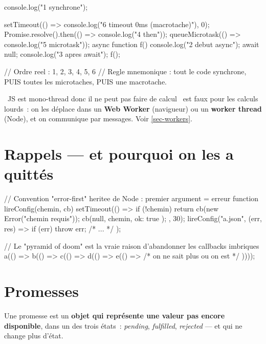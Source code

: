 \begin{codejs}
console.log("1 synchrone");

setTimeout(() => console.log("6 timeout 0ms (macrotache)"), 0);
Promise.resolve().then(() => console.log("4 then"));
queueMicrotask(() => console.log("5 microtask"));
async function f() { console.log("2 debut async"); await null; console.log("3 apres await"); }
f();

// Ordre reel : 1, 2, 3, 4, 5, 6
// Regle mnemonique : tout le code synchrone, PUIS toutes les microtaches, PUIS une macrotache.
\end{codejs}

\begin{note}
\og ~JS est mono-thread donc il ne peut pas faire de calcul~ \fg{} est faux pour les calculs lourds~:
on les d\'eplace dans un \textbf{Web Worker} (navigueur) ou un \textbf{worker thread} (Node),
et on communique par messages. Voir \cref{sec-workers}.
\end{note}

\section{Rappels --- et pourquoi on les a quitt\'es}

\begin{codejs}
// Convention "error-first" heritee de Node : premier argument = erreur
function lireConfig(chemin, cb) {
  setTimeout(() => {
    if (!chemin) return cb(new Error("chemin requis"));
    cb(null, { chemin, ok: true });
  }, 30);
}
lireConfig("a.json", (err, res) => { if (err) throw err; /* ... */ });

// Le "pyramid of doom" est la vraie raison d'abandonner les callbacks imbriques
a(() => b(() => c(() => d(() => e(() => { /* on ne sait plus ou on est */ }))));
\end{codejs}

\section{Promesses}

Une promesse est un \textbf{objet qui repr\'esente une valeur pas encore disponible}, dans un des
trois \'etats~: \emph{pending}, \emph{fulfilled}, \emph{rejected} --- et qui ne change plus d'\'etat.

